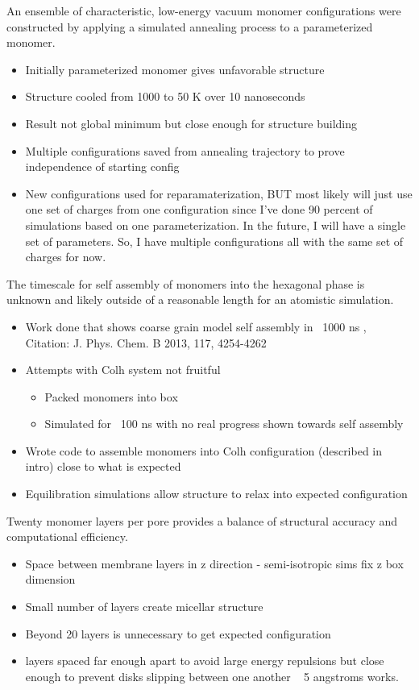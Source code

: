 \documentclass{article}
\begin{document}
	An ensemble of characteristic, low-energy vacuum monomer configurations were constructed by applying a simulated annealing process to a parameterized monomer.
	\begin{itemize}
		\item Initially parameterized monomer gives unfavorable structure %
		\item Structure cooled from 1000 to 50 K over 10 nanoseconds
		\item Result not global minimum but close enough for structure building
		\item Multiple configurations saved from annealing trajectory to prove independence of starting config
		\item New configurations used for reparamaterization, BUT most likely will just use one set of charges from one configuration since I've done 90 percent of simulations based on one parameterization. In the future, I will have a single set of parameters. So, I have multiple configurations all with the same set of charges for now.
	\end{itemize}

	The timescale for self assembly of monomers into the hexagonal phase is unknown and likely outside of a reasonable length for an atomistic simulation. 
	\begin{itemize}
		\item Work done that shows coarse grain model self assembly in ~1000 ns , Citation: J. Phys. Chem. B 2013, 117, 4254-4262
		\item Attempts with Colh system not fruitful  
		\begin{itemize}
			\item Packed monomers into box
			\item Simulated for ~100 ns with no real progress shown towards self assembly
		\end{itemize}  
		\item Wrote code to assemble monomers into Colh configuration (described in intro) close to what is expected 
		\item Equilibration simulations allow structure to relax into expected configuration 
	\end{itemize}

	Twenty monomer layers per pore provides a balance of structural accuracy and computational efficiency. 
	\begin{itemize}
		\item Space between membrane layers in z direction - semi-isotropic sims fix z box dimension
		\item Small number of layers create micellar structure
		\item Beyond 20 layers is unnecessary to get expected configuration
		\item layers spaced far enough apart to avoid large energy repulsions but close enough to prevent disks slipping between one another ~ 5 angstroms works.
	\end{itemize}
	
\end{document}
